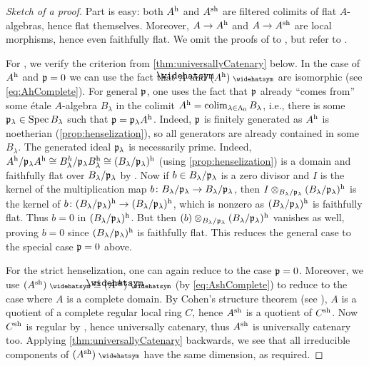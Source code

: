 \documentclass[a4paper, 10pt, oneside, DIV=9, chapterprefix=true, numbers=enddot, bibliography=totoc]{scrbook}
\begin{document}
\begin{proof}[Sketch of a proof]
	Part  is easy: both $A^{\mathrm{h}}$ and $A^{\mathrm{sh}}$ are filtered colimits of flat $A$-algebras, hence flat themselves. Moreover, $A\morphism A^\h$ and $A\morphism A^\sh$ are local morphisms, hence even faithfully flat. We omit the proofs of  to , but refer to \cite[(18.6)~and~(18.8)]{egaIV4}.
	
	For , we verify the criterion from \cref{thm:universallyCatenary} below. In the case of $A^{\mathrm{h}}$ and $\mathfrak{p}=0$ we can use the fact that $\roof{A}$ and $(A^\h)^\complete$ are isomorphic (see \cref{eq:AhComplete}). For general $\mathfrak{p}$, one uses the fact that $\mathfrak{p}$ already \enquote{comes from} some étale $A$-algebra $B_\lambda$ in the colimit $A^{\mathrm{h}}=\operatorname*{colim}_{\lambda\in\Lambda_0}B_\lambda$, i.e., there is some $\mathfrak{p}_\lambda\in\operatorname{Spec} B_\lambda$ such that $\mathfrak{p}=\mathfrak{p}_\lambda A^{\mathrm{h}}$. Indeed, $\mathfrak{p}$ is finitely generated as $A^{\mathrm{h}}$ is noetherian (\cref{prop:henselization}), so all generators are already contained in some $B_\lambda$. The generated ideal $\mathfrak{p}_\lambda$ is necessarily prime. Indeed, $A^{\mathrm{h}}/\mathfrak{p}_\lambda A^{\mathrm{h}}\cong B_\lambda^h/\mathfrak{p}_\lambda B_\lambda ^{\mathrm{h}}\cong (B_\lambda/\mathfrak{p}_\lambda)^{\mathrm{h}}$ (using \cref{prop:henselization}) is a domain and faithfully flat over $B_\lambda/\mathfrak{p}_\lambda$ by . Now if $b\in B_\lambda/\mathfrak{p}_\lambda$ is a zero divisor and $I$ is the kernel of the multiplication map $b\colon B_\lambda/\pp_\lambda\morphism B_\lambda/\pp_\lambda$, then $I\otimes_{B_\lambda/\mathfrak{p}_\lambda}(B_\lambda/\mathfrak{p}_\lambda)^{\mathrm{h}}$ is the kernel of $b\colon (B_\lambda/\pp_\lambda)^\h\morphism (B_\lambda/\pp_\lambda)^\h$, which is nonzero as $(B_\lambda/\mathfrak{p}_\lambda)^{\mathrm{h}}$ is faithfully flat. Thus $b=0$ in $(B_\lambda/\mathfrak{p}_\lambda)^{\mathrm{h}}$. But then $(b)\otimes_{B_\lambda/\mathfrak{p}_\lambda}(B_\lambda/\mathfrak{p}_\lambda)^{\mathrm{h}}$ vanishes as well, proving $b=0$ since $(B_\lambda/\mathfrak{p}_\lambda)^{\mathrm{h}}$ is faithfully flat. This reduces the general case to the special case $\mathfrak{p}=0$ above.
	
	For the strict henselization, one can again reduce to the case $\mathfrak{p}=0$. Moreover, we use $(A^\sh)^\complete\cong (\roof{A}^\sh)^\complete$ (by \cref{eq:AshComplete}) to reduce to the case where $A$ is a complete domain. By Cohen's structure theorem (see \cite[]{stacks-project}), $A$ is a quotient of a complete regular local ring $C$, hence $A^{\mathrm{sh}}$ is a quotient of $C^{\mathrm{sh}}$. Now $C^{\mathrm{sh}}$ is regular by , hence universally catenary, thus $A^{\mathrm{sh}}$ is universally catenary too. Applying \cref{thm:universallyCatenary} backwards, we see that all irreducible components of $(A^\sh)^\complete$ have the same dimension, as required.
\end{proof}
\end{document}

